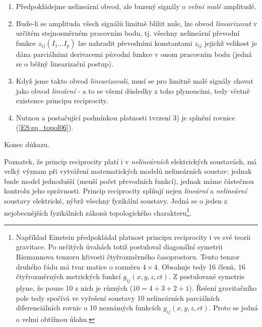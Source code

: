       
      \begin{enumerate}[noitemsep]
        \item Předpokládejme nelineární obvod, ale buzený signály o \emph{velmi malé} amplitudě.
        \item Bude-li se amplituda všech signálů limitně blížit nule, lze obvod 
              \emph{linearizovat} v určitém stejnosměrném pracovním bodu, tj. všechny nelineární 
              převodní funkce \(z_{ij}(I_1\ldots I_p)\) lze nahradit převodními konstantami 
              \(z_{ij}\) jejichž velikost je dána parciálními derivacemi původní funkce v onom 
              pracovním bodu (jedná se o běžný linearizační postup).
        \item Když jsme takto obvod \emph{linearizovali}, musí se pro limitně malé signály chovat 
              jako obvod \emph{lineární} - a to se všemi důsledky z toho plynoucími, tedy včetně 
              existence principu reciprocity.
        \item Nutnou a postačující podmínkou platnosti tvrzení 3) je splnění rovnice 
              (\ref{ES:eq_topol06}).
      \end{enumerate}
      Konec důkazu.
      
      Poznatek, že princip reciprocity platí i v \emph{nelineárních} elektrických soustavách, má 
      velký význam při vytváření matematických modelů nelineárních soustav: jednak bude model 
      jednodušší (menší počet převodních funkcí), jednak máme částečnou kontrolu jeho správnosti. 
      Princip reciprocity splňují nejen \emph{lineární} a \emph{nelineární} soustavy elektrické, 
      nýbrž všechny fyzikální soustavy. Jedná se o jeden z nejobecnějších fyzikálních zákonů 
      topologického charakteru\footnote{Například Einstein předpokládal platnost principu 
      reciprocity i ve své teorii gravitace. Po určitých úvahách totiž postuloval diagonální 
      symetrii Riemannova tenzoru křivosti čtyřrozměrného časoprostoru. Tento tenzor druhého řádu 
      má tvar matice o rozměru \(4\times4\). Obsahuje tedy 16 členů, 16 čtyřrozměrných 
      metrických funkcí \(g_{ij}(x, y, z, ct)\). Z postulované symetrie plyne, že pouze 10 z nich 
      je různých (\(10 = 4+3+2+1\)). Řešení gravitačního pole tedy spočívá ve vyřešení soustavy 10 
      nelineárních parciálních diferenciálních rovnic o 10 neznámých funkcích \(g_{ij}(x, y, z, 
      ct)\). Proto se jedná o velmi obtížnou úlohu.}.
      
